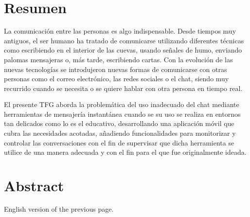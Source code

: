 \chapter{Resumen}
La comunicación entre las personas es algo indispensable. Desde tiempos muy antiguos, el ser humano ha tratado de comunicarse  utilizando diferentes técnicas como escribiendo en el interior de las cuevas, usando señales de humo, enviando palomas mensajeras o, más tarde, escribiendo cartas. Con la evolución de las nuevas tecnologías se introdujeron nuevas formas de comunicarse con otras personas como el correo electrónico, las redes sociales o el chat, siendo muy recurrido cuando se necesita o se quiere hablar con otra persona en tiempo real.

El presente \acf{TFG} aborda la problemática del uso inadecuado del chat mediante herramientas de mensajería instantánea cuando se su uso se realiza en entornos tan delicados como lo es el educativo, desarrollando una aplicación móvil que cubra las necesidades acotadas, añadiendo funcionalidades para monitorizar y controlar las conversaciones con el fin de supervisar que dicha herramienta se utilice de una manera adecuada y con el fin para el que fue originalmente ideada.


\chapter{Abstract}

English version of the previous page.
